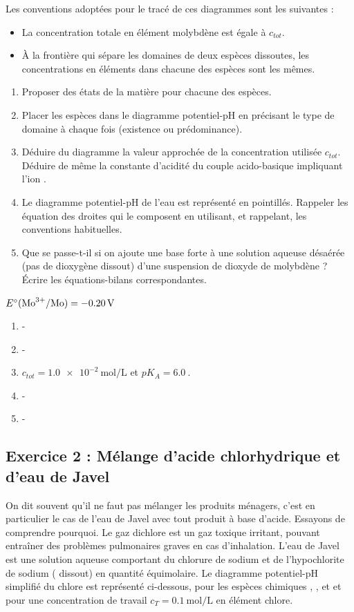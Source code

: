 Les conventions adoptées pour le tracé de ces diagrammes sont les suivantes :
\begin{itemize}
	\item La concentration totale en élément molybdène est égale à $c_{tot}$.
	\item À la frontière qui sépare les domaines de deux espèces dissoutes, les concentrations en éléments  dans chacune des espèces sont les mêmes.
\end{itemize}

\begin{enumerate}
	\item Proposer des états de la matière pour chacune des espèces.
	\item Placer les espèces dans le diagramme potentiel-pH en précisant le type de domaine à chaque fois (existence ou prédominance).
	\item Déduire du diagramme la valeur approchée de la concentration utilisée $c_{tot}$. Déduire de même la constante d'acidité du couple acido-basique impliquant l'ion .
	\item Le diagramme potentiel-pH de l'eau est représenté en pointillés. Rappeler les équation des droites qui le composent en utilisant, et rappelant, les conventions habituelles.
	\item Que se passe-t-il si on ajoute une base forte à une solution aqueuse désaérée (pas de dioxygène dissout) d'une suspension de dioxyde de molybdène ? Écrire les équations-bilans correspondantes.
\end{enumerate}

 $E^\circ(\ce{Mo^3+}/\ce{Mo}) = \SI{-0.20}{\volt}$

\begin{enumerate}
	\item -
	\item -
	\item $c_{tot} = \SI{1.0e-2}{\mol\per\liter}$ et $pK_A = \SI{6.0}{}$.
	\item -
	\item -
\end{enumerate}

\subsection{Exercice 2 : Mélange d'acide chlorhydrique et d'eau de Javel}

On dit souvent qu'il ne faut pas mélanger les produits ménagers, c'est en particulier le cas de l'eau de Javel avec tout produit à base d'acide. Essayons de comprendre pourquoi. Le gaz dichlore est un gaz toxique irritant, pouvant entraîner des problèmes pulmonaires graves en cas d'inhalation. L'eau de Javel est une solution aqueuse comportant du chlorure de sodium et de l'hypochlorite de sodium ( dissout) en quantité équimolaire. Le diagramme potentiel-pH simplifié du chlore est représenté ci-dessous, pour les espèces chimiques , ,  et  et pour une concentration de travail $c_T = \SI{0.1}{\mol\per\liter}$ en élément chlore.

